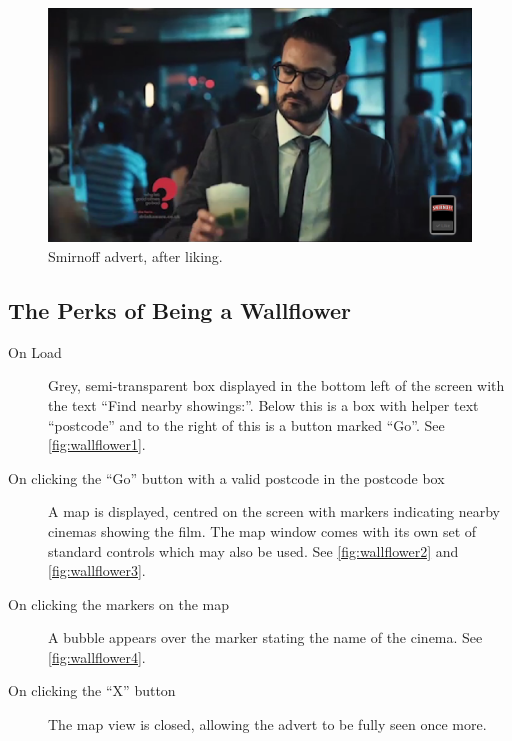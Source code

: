 	\begin{figure}[th]
		\centering
		\includegraphics[width=\textwidth,height=0.5\textheight,keepaspectratio]{images/adverts/smirnoff-2.png}
		\caption{Smirnoff advert, after liking.}
		\label{fig:smirnoff2}
	\end{figure}
	
\subsection{The Perks of Being a Wallflower}
	\begin{description}
		\item[On Load]{Grey, semi-transparent box displayed in the bottom left of the screen with the text ``Find nearby showings:''. Below this is a box with helper text ``postcode'' and to the right of this is a button marked ``Go''. See \ref{fig:wallflower1}.}
		\item[On clicking the ``Go'' button with a valid postcode in the postcode box]{A map is displayed, centred on the screen with markers indicating nearby cinemas showing the film. The map window comes with its own set of standard controls which may also be used. See \ref{fig:wallflower2} and \ref{fig:wallflower3}.}
		\item[On clicking the markers on the map]{A bubble appears over the marker stating the name of the cinema. See \ref{fig:wallflower4}.}
		\item[On clicking the ``X'' button]{The map view is closed, allowing the advert to be fully seen once more.}
	\end{description}
	
